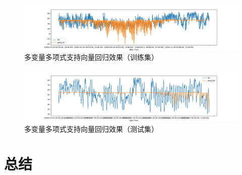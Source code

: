 \documentclass{ctexart}
\begin{document}
\begin{figure}[H]
	\includegraphics[width=1.2\textwidth]{../images/svr5.png}
	\caption{多变量多项式支持向量回归效果（训练集）}
\end{figure}
\begin{figure}[H]
	\includegraphics[width=1.2\textwidth]{../images/svr6.png}
	\caption{多变量多项式支持向量回归效果（测试集）}
\end{figure}
\section{总结}
\end{document}

